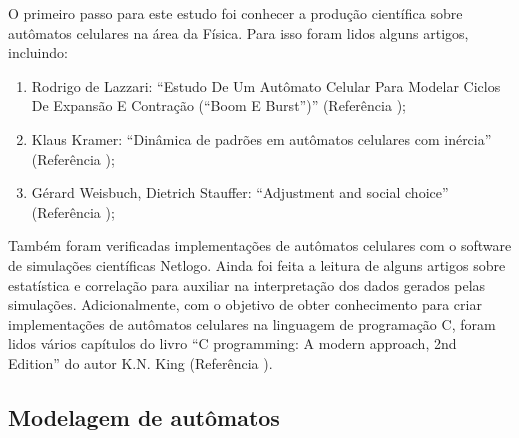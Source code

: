 \documentclass[
	12pt,				%
	openright,			%
	twoside,			%
	a4paper,			%
	english,			%
	french,				%
	spanish,			%
	brazil				%
	]{abntex2}
\begin{document}
O primeiro passo para este estudo foi conhecer a produção científica sobre autômatos celulares na área da Física. Para isso foram lidos alguns artigos, incluindo:
\begin{enumerate}
    \item Rodrigo de Lazzari: “Estudo De Um Autômato Celular Para Modelar Ciclos De Expansão E Contração (“Boom E Burst”)” (Referência \cite{lazzari});
    \item Klaus Kramer: “Dinâmica de padrões em autômatos celulares com inércia” (Referência \cite{klaus});
    \item Gérard Weisbuch, Dietrich Stauffer: “Adjustment and social choice” (Referência \cite{stauffer});
\end{enumerate}
Também foram verificadas implementações de autômatos celulares  com o software de simulações científicas Netlogo. Ainda foi feita a leitura de alguns artigos sobre estatística e correlação para auxiliar na interpretação dos dados gerados pelas simulações. Adicionalmente, com o objetivo de obter conhecimento para criar implementações de autômatos celulares na linguagem de programação C, foram  lidos vários capítulos do livro “C programming: A modern approach, 2nd Edition” do autor K.N. King (Referência \cite{king}).
    
\subsection*{Modelagem de autômatos}
\end{document}
